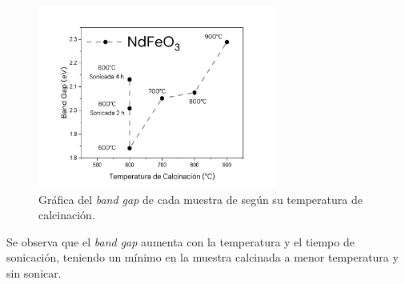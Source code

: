 \documentclass[../main.tex]{subfiles}
\begin{document}
\begin{figure}[H]
    \centering
    \includegraphics[width=0.7\textwidth]{fig/BGNdFeO3.png}
    \caption{Gráfica del \textit{band gap} de cada muestra de \neod{} según su temperatura de calcinación.}
    \label{fig:bandgapvTneod}
\end{figure}
Se observa que el \textit{band gap} aumenta con la temperatura y el tiempo de sonicación, teniendo un mínimo en la muestra calcinada a menor temperatura y sin sonicar.
\end{document}
